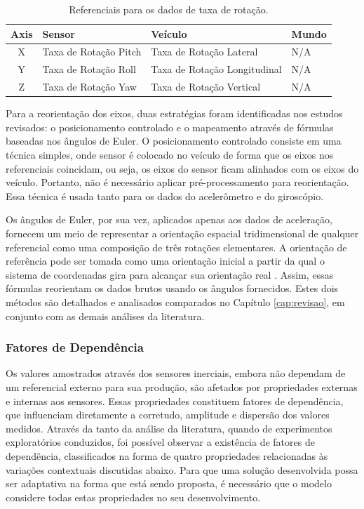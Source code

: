 \begin{table}[h]
    \caption{Referenciais para os dados de taxa de rotação.}
    \label{table:gyroscope_reference_frames}
    \centering
    \small
    \begin{tabular}{clll}
        \toprule
        \textbf{Axis} & \textbf{Sensor} & \textbf{Veículo} & \textbf{Mundo} \\
        \toprule
        X & Taxa de Rotação Pitch & Taxa de Rotação Lateral & N/A \\
        \midrule
        Y & Taxa de Rotação Roll & Taxa de Rotação Longitudinal & N/A \\
        \midrule
        Z & Taxa de Rotação Yaw & Taxa de Rotação Vertical & N/A \\
        \bottomrule
    \end{tabular}
\end{table}

Para a reorientação dos eixos, duas estratégias foram identificadas nos estudos revisados: o posicionamento controlado e o mapeamento através de fórmulas baseadas nos ângulos de Euler. O posicionamento controlado consiste em uma técnica simples, onde sensor é colocado no veículo de forma que os eixos nos referenciais coincidam, ou seja, os eixos do sensor ficam alinhados com os eixos do veículo. Portanto, não é necessário aplicar pré-processamento para reorientação. Essa técnica é usada tanto para os dados do acelerômetro e do giroscópio. 

Os ângulos de Euler, por sua vez, aplicados apenas aos dados de aceleração, fornecem um meio de representar a orientação espacial tridimensional de qualquer referencial como uma composição de três rotações elementares. A orientação de referência pode ser tomada como uma orientação inicial a partir da qual o sistema de coordenadas gira para alcançar sua orientação real \cite{Singh2017}. Assim, essas fórmulas reorientam os dados brutos usando os ângulos fornecidos. Estes dois métodos são detalhados e analisados comparados no Capítulo \ref{cap:revisao}, em conjunto com as demais análises da literatura. 

\subsubsection{Fatores de Dependência}

Os valores amostrados através dos sensores inerciais, embora não dependam de um referencial externo para sua produção, são afetados por propriedades externas e internas aos sensores. Essas propriedades constituem fatores de dependência, que influenciam diretamente a corretudo, amplitude e dispersão dos valores medidos. Através da tanto da análise da literatura, quando de experimentos exploratórios conduzidos, foi possível observar a existência de fatores de dependência, classificados na forma de quatro propriedades relacionadas às variações contextuais discutidas abaixo. Para que uma solução desenvolvida possa ser adaptativa na forma que está sendo proposta, é necessário que o modelo considere todas estas propriedades no seu desenvolvimento.

